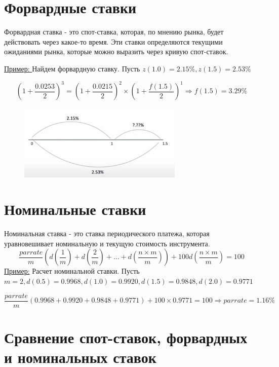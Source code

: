 \documentclass{article}
\begin{document}
\section{Форвардные ставки}

Форвардная ставка - это спот-ставка, которая, по мнению рынка, будет действовать через какое-то время. Эти ставки определяются текущими ожиданиями рынка, которые можно выразить через кривую спот-ставок.

\underline{Пример: } Найдем форвардную ставку. Пусть $z(1.0) = 2.15\%, z(1.5) = 2.53\%$

\begin{equation*}
    (1+\frac{0.0253}{2})^3 = (1+\frac{0.0215}{2})^2 \times (1+\frac{f(1.5)}{2})^1 \Rightarrow f(1.5) = 3.29\%
\end{equation*}

\begin{figure}[h]
\centering
\includegraphics[width=0.7\textwidth]{4.png}
\label{loadings}
\end{figure}

\section{Номинальные ставки}
Номинальная ставка - это ставка периодического платежа, которая уравновешивает номинальную и текущую стоимость инструмента.
\begin{equation*}
    \frac{par rate}{m}(d(\frac{1}{m})+d(\frac{2}{m})+...+d(\frac{n\times m}{m}))+100d(\frac{n \times m}{m}) = 100
\end{equation*}
\underline{Пример:} Расчет номинальной ставки. Пусть $m=2, d(0.5) = 0.9968, d(1.0) = 0.9920, d(1.5) = 0.9848, d(2.0) = 0.9771$

\begin{equation*}
    \frac{par rate}{m}(0.9968+0.9920+0.9848+0.9771)+100\times 0.9771 = 100 \Rightarrow par rate = 1.16\%
\end{equation*}

\section{Сравнение спот-ставок, форвардных и номинальных ставок}
\end{document}
